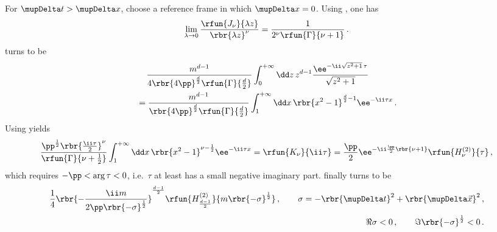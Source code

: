 \documentclass[a4paper]{article}
\numberwithin{equation}{section}
\begin{document}
For $\mupDelta t > \mupDelta x$, choose a reference frame in which 
$\mupDelta x = 0$. Using \cite[eq.\ (10.2.2)]{NIST:DLMF}, one has
\begin{align}
\lim_{\lambda \to 0}\frac{\rfun{J_{\nu}}{\lambda z}}%
	{\rbr{\lambda z}^{{\nu}}} = \frac{1}{2^{\nu}\rfun{\Gamma}{\nu+1}}\,.
\end{align}
 turns to be
\begin{align}
&\quad\,
\frac{m^{d-1}}{4\rbr{4\pp}^{\frac{d}{2}}\rfun{\Gamma}{\frac{d}{2}}}
\int_{0}^{+\infty} \dd z\,z^{d-1}
	\frac{\ee^{-\ii \sqrt{z^2+1}\,\tau}}{\sqrt{z^2+1}}
\nonumber \\
&=
\frac{m^{d-1}}{\rbr{4\pp}^{\frac{d}{2}}\rfun{\Gamma}{\frac{d}{2}}}
\int_{1}^{+\infty} \dd x\,\rbr{x^2-1}^{\frac{d}{2}-1} \ee^{-\ii \tau x}\,.
\end{align}
Using \cite[eq.\ (10.32.8) and (10.27.8)]{NIST:DLMF} yields
\begin{align}
\frac{\pp^{\frac{1}{2}} \rbr{\frac{\ii \tau}{2}}^{\nu}}%
	{\rfun{\Gamma}{\nu+\frac{1}{2}}}
\int_{1}^{+\infty} \dd x\,\rbr{x^2-1}^{\nu-\frac{1}{2}}\ee^{-\ii \tau x}
= \rfun{K_{\nu}}{\ii \tau} = \frac{\pp}{2}\ee^{-\ii \frac{\pp}{2}\rbr{\nu+1}}
\rfun{H_{\nu}^{(2)}}{\tau}\,,
\end{align}
which requires $-\pp < \arg \tau < 0$, i.e.\ $\tau$ at least has a small
negative imaginary part.  finally turns to be
\begin{align}
\frac{1}{4} 
\rbr{-\frac{\ii m}{2\pp \rbr{-\sigma}^{\frac{1}{2}}}}^{\frac{d-1}{2}}
\rfun{H^{(2)}_{\frac{d-1}{2}}}{m \rbr{-\sigma}^{\frac{1}{2}}}\,,
\qquad
\sigma = -\rbr{\mupDelta t}^2 + \rbr{\mupDelta \vec{x}}^2\,,
\\
\Re\sigma < 0\,,
\qquad
\Im\rbr{-\sigma}^{\frac{1}{2}} < 0\,.
\end{align}

%


\printbibliography
\end{document}
